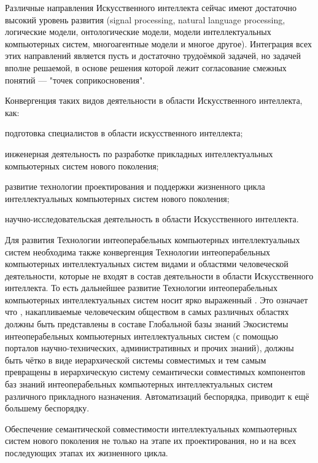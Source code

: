 \begin{textitemize}
	Различные направления Искусственного интеллекта сейчас имеют достаточно высокий уровень развития (signal processing, natural language processing, логические модели, онтологические модели, модели интеллектуальных компьютерных систем, многоагентные модели и многое другое). Интеграция всех этих направлений является пусть и достаточно трудоёмкой задачей, но задачей вполне решаемой, в основе решения которой лежит согласование смежных понятий --- "точек соприкосновения"{}.
	\item Конвергенция таких видов деятельности в области Искусственного интеллекта, как:
	\begin{textitemize}
		\item подготовка специалистов в области искусственного интеллекта;
		\item инженерная деятельность по разработке прикладных интеллектуальных компьютерных систем нового поколения;
		\item развитие технологии проектирования и поддержки жизненного цикла интеллектуальных компьютерных систем нового поколения;
		\item научно-исследовательская деятельность в области Искусственного интеллекта.
	\end{textitemize}
	\item Для развития Технологии интеоперабельных компьютерных интеллектуальных систем необходима также конвергенция Технологии интеоперабельных компьютерных интеллектуальных систем  видами и областями человеческой деятельности, которые не входят в состав деятельности в области Искусственного интеллекта. То есть дальнейшее развитие Технологии интеоперабельных компьютерных интеллектуальных систем носит ярко выраженный . Это означает что , накапливаемые человеческим обществом в самых различных областях должны быть представлены в составе Глобальной базы знаний Экосистемы интеоперабельных компьютерных интеллектуальных систем (с помощью порталов научно-технических, административных и прочих знаний), должны быть чётко  в виде иерархической системы  совместимых  и тем самым превращены в иерархическую систему семантически совместимых компонентов баз знаний интеоперабельных компьютерных интеллектуальных систем различного прикладного назначения. Автоматизаций беспорядка, приводит к ещё большему беспорядку.
	\item Обеспечение семантической совместимости интеллектуальных компьютерных систем нового поколения не только на этапе их проектирования, но и на всех последующих этапах их жизненного цикла.

\end{textitemize}
